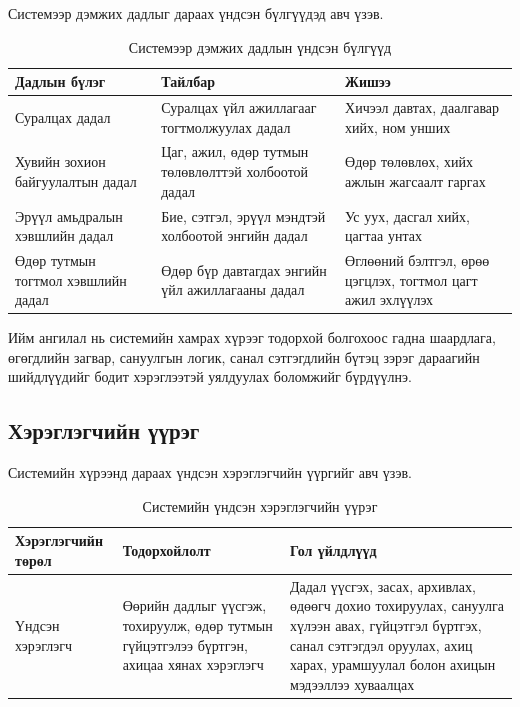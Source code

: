 Системээр дэмжих дадлыг дараах үндсэн бүлгүүдэд авч үзэв.

\begin{table}[H]
\centering
\small
\setlength{\tabcolsep}{4pt}
\begin{tabular}{|L{3.5cm}|L{6.0cm}|L{4.0cm}|}
\hline
\textbf{Дадлын бүлэг} & \textbf{Тайлбар} & \textbf{Жишээ} \\
\hline
Суралцах дадал & Суралцах үйл ажиллагааг тогтмолжуулах дадал & Хичээл давтах, даалгавар хийх, ном унших \\
\hline
Хувийн зохион байгуулалтын дадал & Цаг, ажил, өдөр тутмын төлөвлөлттэй холбоотой дадал & Өдөр төлөвлөх, хийх ажлын жагсаалт гаргах \\
\hline
Эрүүл амьдралын хэвшлийн дадал & Бие, сэтгэл, эрүүл мэндтэй холбоотой энгийн дадал & Ус уух, дасгал хийх, цагтаа унтах \\
\hline
Өдөр тутмын тогтмол хэвшлийн дадал & Өдөр бүр давтагдах энгийн үйл ажиллагааны дадал & Өглөөний бэлтгэл, өрөө цэгцлэх, тогтмол цагт ажил эхлүүлэх \\
\hline
\end{tabular}
\caption{Системээр дэмжих дадлын үндсэн бүлгүүд}
\end{table}

Ийм ангилал нь системийн хамрах хүрээг тодорхой болгохоос гадна шаардлага, өгөгдлийн загвар, сануулгын логик, санал сэтгэгдлийн бүтэц зэрэг дараагийн шийдлүүдийг бодит хэрэглээтэй уялдуулах боломжийг бүрдүүлнэ.

\subsection{Хэрэглэгчийн үүрэг}

Системийн хүрээнд дараах үндсэн хэрэглэгчийн үүргийг авч үзэв.

\begin{table}[H]
\centering
\small
\setlength{\tabcolsep}{4pt}
\begin{tabular}{|L{3.0cm}|L{4.3cm}|L{6.2cm}|}
\hline
\textbf{Хэрэглэгчийн төрөл} & \textbf{Тодорхойлолт} & \textbf{Гол үйлдлүүд} \\
\hline
Үндсэн хэрэглэгч & Өөрийн дадлыг үүсгэж, тохируулж, өдөр тутмын гүйцэтгэлээ бүртгэн, ахицаа хянах хэрэглэгч & Дадал үүсгэх, засах, архивлах, өдөөгч дохио тохируулах, сануулга хүлээн авах, гүйцэтгэл бүртгэх, санал сэтгэгдэл оруулах, ахиц харах, урамшуулал болон ахицын мэдээллээ хуваалцах \\
\hline
\end{tabular}
\caption{Системийн үндсэн хэрэглэгчийн үүрэг}
\end{table}

